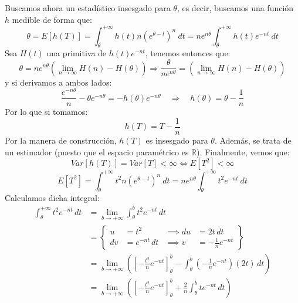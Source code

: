 \begin{ejercicio}
    Buscamos ahora un estadístico insesgado para $\theta$, es decir, buscamos una función $h$ medible de forma que:
    \begin{equation*}
        \theta = E[h(T)] = \int_{\theta}^{+\infty} h(t) n{(e^{\theta-t})}^{n}~dt  = ne^{n\theta}\int_{\theta}^{+\infty} h(t)e^{-nt}~dt 
    \end{equation*}
    Sea $H(t)$ una primitiva de $h(t)e^{-nt}$, tenemos entonces que:
    \begin{equation*}
        \theta = ne^{n\theta}\left(\lim_{n\to\infty}H(n)-H(\theta )\right) \Longrightarrow \frac{\theta}{ne^{n\theta}} = \left(\lim_{n\to\infty}H(n)-H(\theta )\right)
    \end{equation*}
    y si derivamos a ambos lados:
    \begin{equation*}
        \dfrac{e^{-n\theta}}{n} - \theta e^{-n\theta} = -h(\theta)e^{-n\theta} \quad \Longrightarrow \quad  h(\theta) = \theta-\frac{1}{n}
    \end{equation*}
    Por lo que si tomamos:
    \begin{equation*}
        h(T) = T - \dfrac{1}{n}
    \end{equation*}
    Por la manera de construcción, $h(T)$ es insesgado para $\theta$. Además, se trata de un estimador (puesto que el espacio paramétrico es $\mathbb{R}$). Finalmente, vemos que:
    \begin{equation*}
        Var[h(T)] = Var[T]<\infty \iff E[T^2] <\infty
    \end{equation*}
    \begin{equation*}
        E[{T}^{2}] = \int_{\theta}^{+\infty} t^2n{\left(e^{\theta-t}\right)}^{n}~dt  = ne^{n\theta} \int_{\theta}^{+\infty} t^2e^{-nt}~dt  
    \end{equation*}
    Calculamos dicha integral:
    \begin{align*}
\int_{\theta}^{+\infty} t^2 e^{-nt} \, dt 
&= \lim_{b \to +\infty} \int_{\theta}^{b} t^2 e^{-nt} \, dt \\
&= \left\{
\begin{aligned}
u &= t^2 &\implies du &= 2t \, dt \\
dv &= e^{-nt} \, dt &\implies v &= -\frac{1}{n} e^{-nt}
\end{aligned}
\right\} \\
&= \lim_{b \to +\infty} \left( \left[ -\frac{t^2}{n} e^{-nt} \right]_{\theta}^{b} - \int_{\theta}^{b} \left( -\frac{1}{n} e^{-nt} \right) (2t) \, dt \right) \\
&= \lim_{b \to +\infty} \left( \left[ -\frac{t^2}{n} e^{-nt} \right]_{\theta}^{b} + \frac{2}{n} \int_{\theta}^{b} t e^{-nt} \, dt \right) \\

\end{align*}
\end{ejercicio}
